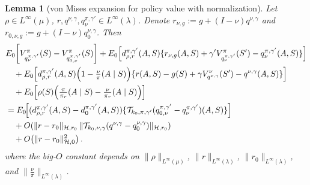 \documentclass[11pt]{article}
\theoremstyle{plain}
\newtheorem{lemma}[theorem]{Lemma}
\begin{document}
\begin{lemma}[von Mises expansion for policy value with normalization]
\label{lemma::vonmisespolicyvaluenormalization}
Let $\rho \in L^\infty(\mu)$, $r, q^{\nu,\gamma}, q_{\nu}^{\pi,\gamma'} \in L^\infty(\lambda)$. Denote $r_{\nu,g} := g + (I - \nu)q^{\nu,\gamma}$ and $r_{0,\nu,g} := g + (I - \nu)q_0^{\nu,\gamma}$. Then
    \begin{align*} 
& E_0\!\left[V_{q_{\nu}^{\pi,\gamma'}}^\pi(S) - V_{q_{0,\nu}^{\pi,\gamma'}}^\pi(S)\right] 
+ E_0\!\left[d_{\rho,r}^{\pi,\gamma'}(A,S)\{r_{\nu,g}(A,S) + \gamma' V_{q_{\nu}^{\pi,\gamma'}}^\pi(S') - q_{\nu}^{\pi,\gamma'}(A,S)\}\right] \\
&\quad + E_0\!\left[d_{\rho,r}^{\pi,\gamma'}(A,S)\Bigl(1 - \tfrac{\nu}{\pi}(A \mid S)\Bigr)\{r(A,S)-g(S) + \gamma V_{q^{\nu,\gamma}}^{\nu}(S') - q^{\nu,\gamma}(A,S)\}\right] \\
&\quad + E_0\!\left[\rho(S)\Bigl(\tfrac{\pi}{\pi_r}(A\mid S) - \tfrac{\nu}{\pi_r}(A\mid S)\Bigr)\right] \\
&= E_0\!\Big[(d_{\rho,r}^{\pi,\gamma'}(A,S) - d_0^{\pi,\gamma'}(A,S))\{\mathcal{T}_{k_0, \pi, \gamma'}(q_{0,\nu}^{\pi,\gamma'} - q_{\nu}^{\pi,\gamma'})(A,S)\}\Big] \\
&\quad + O\!\left(\|r - r_0\|_{\mathcal{H},r_0}\,\|\mathcal{T}_{k_0,\nu,\gamma}(q^{\nu,\gamma} - q_0^{\nu,\gamma})\|_{\mathcal{H},r_0}\right) \\
&\quad + O\!\left(\|r - r_0\|_{\mathcal{H}, 0}^2\right).
\end{align*}
where the big-$O$ constant depends on $\|\rho\|_{L^\infty(\mu)}$, $\|r\|_{L^\infty(\lambda)}$, $\|r_0\|_{L^\infty(\lambda)}$, and $\|\tfrac{\nu}{\pi}\|_{L^\infty(\lambda)}$. 
\end{lemma}
\end{document}
